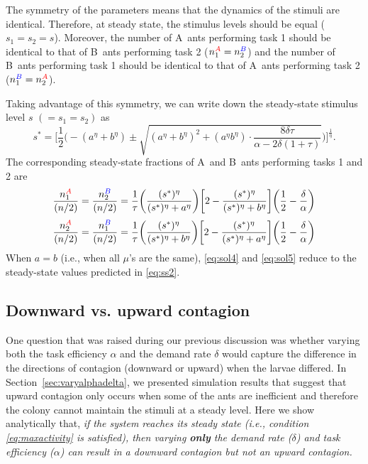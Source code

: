\documentclass[11pt]{article}
\newcommand{\A}{{\color{red}A}}
\newcommand{\B}{{\color{blue}B}}
\begin{document}
\begin{appendices}
The symmetry of the parameters means that the dynamics of the stimuli are identical. Therefore, at steady state, the stimulus levels should be equal ($s_1 = s_2 = s$). Moreover, the number of \A\ ants performing task 1 should be identical to that of \B\ ants performing task 2 ($n_{1}^{\A} = n_{2}^{\B}$) and the number of \B\ ants performing task 1 should be identical to that of \A\ ants performing task 2 ($n_{1}^{\B} = n_{2}^{\A}$).

Taking advantage of this symmetry, we can write down the steady-state stimulus level $s$ $(=s_1 = s_2)$ as
\begin{equation}
    s^* = \bigg[\frac{1}{2} \bigg( -({a}^\eta + {b}^\eta) 
    \pm \sqrt{
    ({a}^\eta + {b}^\eta)^2 + ({a}^\eta {b}^\eta)\cdot \frac{8\delta \tau}{\alpha - 2\delta (1+\tau)}
    } \bigg)\bigg]^\frac{1}{\eta}.
\end{equation}
The corresponding steady-state fractions of \A\ and \B\ ants performing tasks 1 and 2 are
\begin{equation}
    \frac{n_1^{\A}}{(n/2)} =  \frac{n_2^{\B}}{(n/2)} = \frac{1}{\tau} \bigg(\frac{(s^*)^\eta}{(s^*)^\eta + {a}^\eta} \bigg)\bigg[2 - \frac{(s^*)^\eta}{(s^*)^\eta + {b}^\eta}  \bigg] \bigg(\frac{1}{2} - \frac{\delta}{\alpha} \bigg)
    \label{eq:sol4}
\end{equation}
\begin{equation}
    \frac{n_2^{\A}}{(n/2)} =  \frac{n_1^{\B}}{(n/2)}  = \frac{1}{\tau} \bigg(\frac{(s^*)^\eta}{(s^*)^\eta + {b}^\eta} \bigg)\bigg[2 - \frac{(s^*)^\eta}{(s^*)^\eta + {a}^\eta}  \bigg] \bigg(\frac{1}{2} - \frac{\delta}{\alpha} \bigg)
    \label{eq:sol5}
\end{equation}
When $a = b$ (i.e., when all $\mu$'s are the same), \eqref{eq:sol4} and \eqref{eq:sol5} reduce to the steady-state values predicted in \eqref{eq:ss2}.


\subsection{Downward vs. upward contagion}

One question that was raised during our previous discussion was whether varying both the task efficiency $\alpha$ and the demand rate $\delta$ would capture the difference in the directions of contagion (downward or upward) when the larvae differed. In Section~\ref{sec:varyalphadelta}, we presented simulation results that suggest that upward contagion only occurs when some of the ants are inefficient and therefore the colony cannot maintain the stimuli at a steady level. Here we show analytically that, \textit{if the system reaches its steady state (i.e., condition \eqref{eq:maxactivity} is satisfied), then varying \textbf{only} the demand rate ($\delta$) and task efficiency ($\alpha$) can result in a downward contagion but not an upward contagion.}


\end{appendices}
\end{document}
